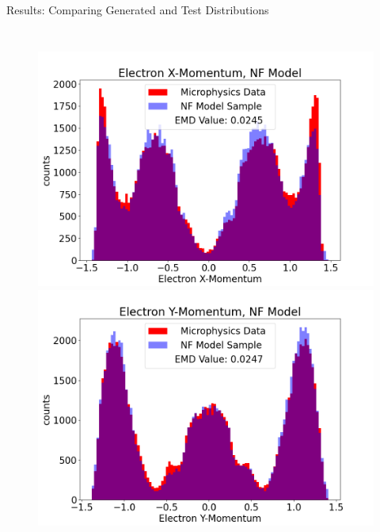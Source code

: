 \documentclass[aspectratio=169]{beamer}
\begin{document}
\begin{frame}{Results: Comparing Generated and Test Distributions}
\begin{columns}
             \begin{figure}[H]
            \centering
            \includegraphics[width=.97\textwidth]{images/Features16/Electron_X-Momentum,_NF_Model.png}
            \includegraphics[width=.97\textwidth]{images/Features16/Electron_Y-Momentum,_NF_Model.png}
            \end{figure}
    \end{columns}
\end{frame}
\end{document}
